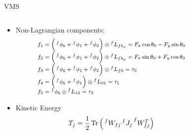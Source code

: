     \begin{frame}{VMS}
        \begin{columns}
            \begin{column}{0.5\textwidth}
                \begin{itemize}
                    \item Non-Lagrangian components:
                    \begin{equation}
                        \begin{footnotesize}
                        \begin{array}{l}
                        f_1=\Big(\prescript{f}{}{\phi_b}+\prescript{f}{}{\phi_1}+\prescript{f}{}{\phi_2}\Big)\otimes \prescript{f}{}{L_{fb_x}}=F_x\cos{\theta_0}-F_y\sin{\theta_0}\\
                        f_2=\Big(\prescript{f}{}{\phi_b}+\prescript{f}{}{\phi_1}+\prescript{f}{}{\phi_2}\Big)\otimes \prescript{f}{}{L_{fb_y}}=F_x\sin{\theta_0}+F_y\cos{\theta_0}\\
                        f_3=\Big(\prescript{f}{}{\phi_b}+\prescript{f}{}{\phi_1}+\prescript{f}{}{\phi_2}\Big)\otimes \prescript{f}{}{L_{f0}}=\tau_0\\
                        f_4=\Big(\prescript{f}{}{\phi_b}+\prescript{f}{}{\phi_1}\Big)\otimes \prescript{f}{}{L_{01}}=\tau_1\\
                        f_5=\prescript{f}{}{\phi_b}\otimes \prescript{f}{}{L_{12}}=\tau_2
                        \end{array}
                    \end{footnotesize}
                      \end{equation}
                    \item Kinetic Energy
                    \begin{equation}
                          T_j=\frac{1}{2}\operatorname{Tr}{\Big(\prescript{f}{}{W_{fj}}\prescript{f}{}{J_j}\prescript{f}{}{W_{fj}^T}\Big)}
                      \end{equation} 
                \end{itemize}
            \end{column}
            \begin{column}{0.5\textwidth}
                \begin{table}
                    \caption{Moments of inertia of the planar VMS' bodies, with respect to their centre of mass (in the centre of the base and the arms), with $i=\{1,2\}$.}
                    \begin{center}

\end{center}
\end{table}
\end{column}
\end{columns}
\end{frame}
